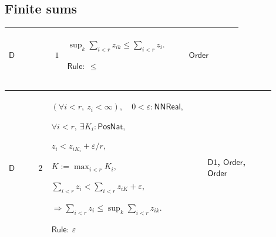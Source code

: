 \documentclass[12pt,reqno]{amsart}
\theoremstyle{blueplain}
\numberwithin{equation}{section}
\newlength{\FATOUOneColumnBody}
\begin{document}
\subsection{\protect\scriptsize Finite sums}

{\scriptsize \setlength{\parskip}{0pt}\nointerlineskip
\noindent 
\begin{tabular}{|@{}>{\centering\arraybackslash}m{\FATOUOneColumnBody}|}
\hline
$\displaystyle \mathsf{Context\_D}:=$\par$\displaystyle r:\mathsf{PosNat}%
,\quad z:\mathsf{Fin}(r)\to\mathsf{PosNat}\to\mathsf{E},$\par$\displaystyle %
\forall i:\mathsf{Fin}(r),\ z_{ik}\uparrow z_i.$ \\ \hline
\end{tabular}%
}

{\scriptsize \setlength{\parskip}{0pt}\nointerlineskip
\noindent 
\begin{tabular}{|@{}>{\centering\arraybackslash}m{0.10658\linewidth}|>{\centering\arraybackslash}m{0.03553\linewidth}|>{\centering\arraybackslash}m{0.52105\linewidth}|>{\centering\arraybackslash}m{0.23684\linewidth}|}
\hline
\hypertarget{proof:D1}{$\displaystyle \mathsf{D}$} & $\displaystyle 1$ & $%
\displaystyle \sup_k\sum_{i<r}z_{ik}\le\sum_{i<r}z_i.$\par$\displaystyle 
\mathsf{Rule}:\ \le$ & \hyperlink{ax:Order}{$\displaystyle \mathsf{Order}$}
\\ \hline
\end{tabular}%
}

{\scriptsize \setlength{\parskip}{0pt}\nointerlineskip
\noindent 
\begin{tabular}{|@{}>{\centering\arraybackslash}m{0.10658\linewidth}|>{\centering\arraybackslash}m{0.03553\linewidth}|>{\centering\arraybackslash}m{0.52105\linewidth}|>{\centering\arraybackslash}m{0.23684\linewidth}|}
\hline
\hypertarget{proof:D2}{$\displaystyle \mathsf{D}$} & $\displaystyle 2$ & $%
\displaystyle (\forall i<r,\ z_i<\infty),\quad0<\varepsilon:\mathsf{NNReal},$%
\par$\displaystyle \forall i<r,\ \exists K_i:\mathsf{PosNat},$\par$%
\displaystyle z_i<z_{iK_i}+\varepsilon/r,$\par$\displaystyle %
K:=\max_{i<r}K_i,$\par$\displaystyle \sum_{i<r}z_i<\sum_{i<r}z_{iK}+%
\varepsilon,$\par$\displaystyle \Rightarrow\sum_{i<r}z_i\le\sup_k%
\sum_{i<r}z_{ik}.$\par$\displaystyle \mathsf{Rule}:\ \varepsilon$ & 
\hyperlink{proof:D1}{$\displaystyle \mathsf{D1}$}, \hyperlink{lem:Order}{$%
\displaystyle \mathsf{Order}$}, \hyperlink{ax:Order}{$\displaystyle \mathsf{%
Order}$} \\ \hline
\end{tabular}%
}
\end{document}
